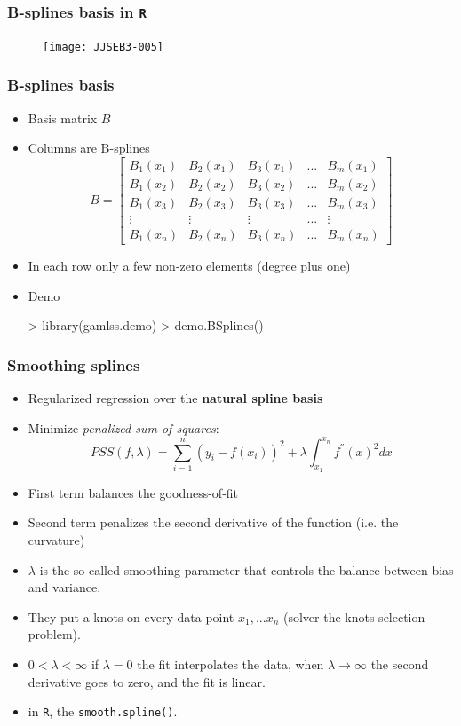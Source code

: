 \documentclass[11pt]{beamer}
\begin{document}
\begin{frame}[fragile]
  \frametitle{B-splines basis in \texttt{R}}

\begin{figure}
\centering
\texttt{[image: JJSEB3-005]}
\end{figure}
\end{frame}


\begin{frame}[fragile]
  \frametitle{B-splines basis}
  \begin{itemize}
    \item Basis matrix $B$
    \item Columns are B-splines
    $$
    B = 
    \begin{bmatrix}
    B_1(x_1) & B_2(x_1) & B_3(x_1) & ... & B_m(x_1) \\
    B_1(x_2) & B_2(x_2) & B_3(x_2) & ... & B_m(x_2) \\
    B_1(x_3) & B_2(x_3) & B_3(x_3) & ... & B_m(x_3) \\
    \vdots & \vdots & \vdots & ... & \vdots \\ 
    B_1(x_n) & B_2(x_n) & B_3(x_n) & ... & B_m(x_n)
    \end{bmatrix}
    $$
  \item In each row only a few non-zero elements (degree plus one)
  \item Demo
\begin{Schunk}
\begin{Sinput}
> library(gamlss.demo)
> demo.BSplines()
\end{Sinput}
\end{Schunk}
  \end{itemize}
\end{frame}



\begin{frame}[fragile]
 \frametitle{Smoothing splines}
 \footnotesize
 \begin{itemize}
\item Regularized regression over the {\bf natural spline basis}
\item Minimize \emph{penalized sum-of-squares}:
\[
PSS(f,\lambda)=\sum_{i=1}^{n}(y_i-f(x_i))^2+\lambda\int_{x_1}^{x_n}f^{''}(x)^2dx
\]
\item First term balances the goodness-of-fit 
\item Second term penalizes the second derivative of the function (i.e. the curvature)
\item $\lambda$ is the so-called smoothing parameter that controls the balance between bias and variance.
\item They put a knots on every data point $x_1,...x_n$ (solver the knots selection problem).
\item $0<\lambda<\infty$ if $\lambda=0$ the fit interpolates the data, when $\lambda\rightarrow\infty$ the second derivative goes to zero, and the fit is linear.
\item in \texttt{R}, the \texttt{smooth.spline()}.
 \end{itemize}
\end{frame}
\end{document}
